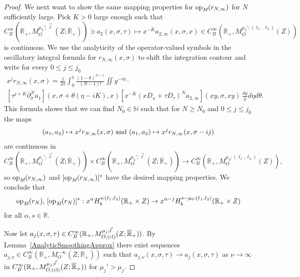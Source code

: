 \documentclass[reqno]{amsart}
\numberwithin{equation}{section}
\theoremstyle{definition}
\def\N{\mathbb N}
\def\R{\mathbb R}
\def\opm{\textup{op}_{\textit{M}}}
\begin{document}
\begin{proof}
We next want to show the same mapping properties for $\opm(r_{N,\infty})$ for $N$ sufficiently large. Pick $K > 0$ large enough such that
$$
C^{\infty}_B(\R_+,M^{\mu_2';\vec{\ell}}_{O}(Z;\overline{\R}_+)) \!\ni\! a_2(x,\sigma,\tau) \mapsto x^{-K}a_{2,\infty}(x,\sigma,x) \!\in\! C^{\infty}_B(\R_+,M^{\mu_2';(\ell_1,\ell_2)}_{O}(Z))
$$
is continuous. We use the analyticity of the operator-valued symbols in the oscillatory integral formula for $r_{N,\infty}(x,\sigma)$ to shift the integration contour and write for every $0 \leq j \leq j_0$
\begin{gather*}
x^jr_{N,\infty}(x,\sigma) = \frac{1}{2\pi}\! \int_0^1\!\frac{(1-\theta)^{N-1}}{(N-1)!} \iint y^{-i\eta} \cdot \\
[\tau^{j+K}\partial_{\sigma}^Na_1](x,\sigma+\theta(\eta-iK),x)[x^{-K}(xD_{x}+\tau D_{\tau})^Na_{2,\infty}](xy,\sigma,xy)\,\frac{dy}{y}d\eta d\theta.
\end{gather*}
This formula shows that we can find $N_0 \in \N$ such that for $N \geq N_0$ and $0 \leq j \leq j_0$ the maps
$$
(a_1,a_2) \mapsto x^jr_{N,\infty}(x,\sigma) \textup{ and } (a_1,a_2) \mapsto x^jr_{N,\infty}(x,\sigma-ij)
$$
are continuous in
$$
C^{\infty}_B(\R_+,M^{\mu_1';\vec{\ell}}_{O}(Z;\overline{\R}_+)) \times C^{\infty}_B(\R_+,M^{\mu_2';\vec{\ell}}_{O}(Z;\overline{\R}_+)) \to C^{\infty}_B(\R_+,M^{\mu_0;(\ell_1,\ell_2)}_{O}(Z)),
$$
so $\opm(r_{N,\infty})$ and $[\opm(r_{N,\infty})]^*$ have the desired mapping properties. We conclude that
$$
\opm(r_{N}),\, [\opm(r_{N})]^* : x^{\alpha}H^{s;(\ell_1,\ell_2)}_b(\R_+\times Z) \to x^{\alpha-j}H^{s-\mu_0;(\ell_1,\ell_2)}_b(\R_+\times Z)
$$
for all $\alpha,s \in \R$.

Now let $a_j(x,\sigma,\tau) \in C^{\infty}_B(\R_+,M^{\mu_j;\vec{\ell}}_{O,\textup{(cl)}}(Z;\overline{\R}_+))$. By Lemma~\ref{AnalyticSmoothingApprox} there exist sequences $a_{j,\nu} \in C^{\infty}_B(\R_+,M^{-\infty}_{O}(Z;\overline{\R}_+))$ such that $a_{j,\nu}(x,\sigma,\tau) \to a_j(x,\sigma,\tau)$ as $\nu \to \infty$ in $C^{\infty}_B(\R_+,M^{\mu_j;\vec{\ell}}_{O,\textup{(cl)}}(Z;\overline{\R}_+))$ for $\mu_j' > \mu_j$.


\end{proof}
\end{document}
